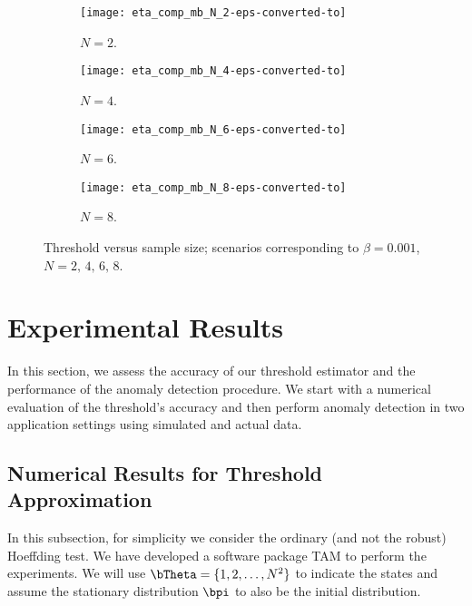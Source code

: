 \documentclass[10pt, twocolumn]{IEEEtran}
\begin{document}
\begin{figure}[thpb]  
	\centering
	\begin{subfigure}[b]{0.485\textwidth}
		\texttt{[image: eta\_comp\_mb\_N\_2-eps-converted-to]} 
		\caption{$N = 2$.}
		\label{fig1:N2}
	\end{subfigure} 
	\begin{subfigure}[b]{0.485\textwidth}
		\texttt{[image: eta\_comp\_mb\_N\_4-eps-converted-to]}
		\caption{$N = 4$.}
		\label{fig1:N3}
	\end{subfigure}   
	\begin{subfigure}[b]{0.485\textwidth}
		\texttt{[image: eta\_comp\_mb\_N\_6-eps-converted-to]}
		\caption{$N = 6$.}
		\label{fig1:N4}
	\end{subfigure}  
	\begin{subfigure}[b]{0.485\textwidth}
		\texttt{[image: eta\_comp\_mb\_N\_8-eps-converted-to]}
		\caption{$N = 8$.}
		\label{fig1:N5}
	\end{subfigure}  
	\caption{Threshold versus sample size; scenarios
		corresponding to $\beta = 0.001$, $N = 2, \,4, \,6, \,8$.}
	\label{fig1:N2345}
\end{figure}


\section{Experimental Results} \label{sec:num}

In this section, we assess the accuracy of our threshold estimator and
the performance of the anomaly detection procedure. We start with a
numerical evaluation of the threshold's accuracy and then perform
anomaly detection in two application settings using simulated and actual
data.

\subsection{Numerical Results for Threshold
  Approximation} \label{sec:num.A} 

In this subsection, for simplicity we consider the ordinary (and not the
robust) Hoeffding test. We have developed a software package TAM
\cite{TAHTMA} to perform the experiments. We will use
${\bTheta} = \{1,2,\ldots,N^2\}$ to indicate the states and
assume the stationary distribution ${\bpi}$ to also be the initial
distribution.
\end{document}
